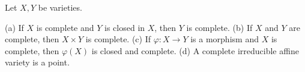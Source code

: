 Let $X, Y$ be varieties.

(a) If $X$ is complete and $Y$ is closed in $X$, then $Y$ is complete.
(b) If $X$ and $Y$ are complete, then $X \times Y$ is complete.
(c) If $\varphi: X \rightarrow Y$ is a morphism and $X$ is complete, then $\varphi(X)$ is closed and complete.
(d) A complete irreducible affine variety is a point.

